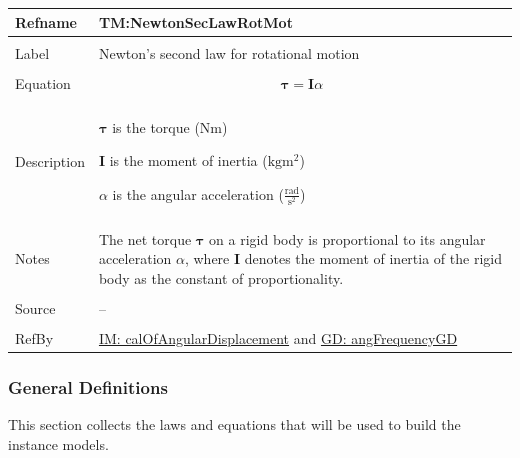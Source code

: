\documentclass[12pt]{article}
\begin{document}
\begin{minipage}{\textwidth}
\begin{tabular}{>{\raggedright}p{}>{\raggedright\arraybackslash}p{}}
\toprule \textbf{Refname} & \textbf{TM:NewtonSecLawRotMot}
\label{TM:NewtonSecLawRotMot}
\\ \midrule \\
Label & Newton's second law for rotational motion
        
\\ \midrule \\
Equation & \begin{displaymath}
           \mathbf{τ}=\mathbf{I} α
           \end{displaymath}
\\ \midrule \\
Description & \begin{symbDescription}
              \item{$\mathbf{τ}$ is the torque ($\text{N}\text{m}$)}
              \item{$\mathbf{I}$ is the moment of inertia ($\text{kg}\text{m}^{2}$)}
              \item{$α$ is the angular acceleration ($\frac{\text{rad}}{\text{s}^{2}}$)}
              \end{symbDescription}
\\ \midrule \\
Notes & The net torque $\mathbf{τ}$ on a rigid body is proportional to its angular acceleration $α$, where $\mathbf{I}$ denotes the moment of inertia of the rigid body as the constant of proportionality.
        
\\ \midrule \\
Source & --
         
\\ \midrule \\
RefBy & \hyperref[IM:calOfAngularDisplacement]{IM: calOfAngularDisplacement} and \hyperref[GD:angFrequencyGD]{GD: angFrequencyGD}
        
\\ \bottomrule
\end{tabular}
\end{minipage}
\subsubsection{General Definitions}
\label{Sec:GDs}
This section collects the laws and equations that will be used to build the instance models.
\end{document}

